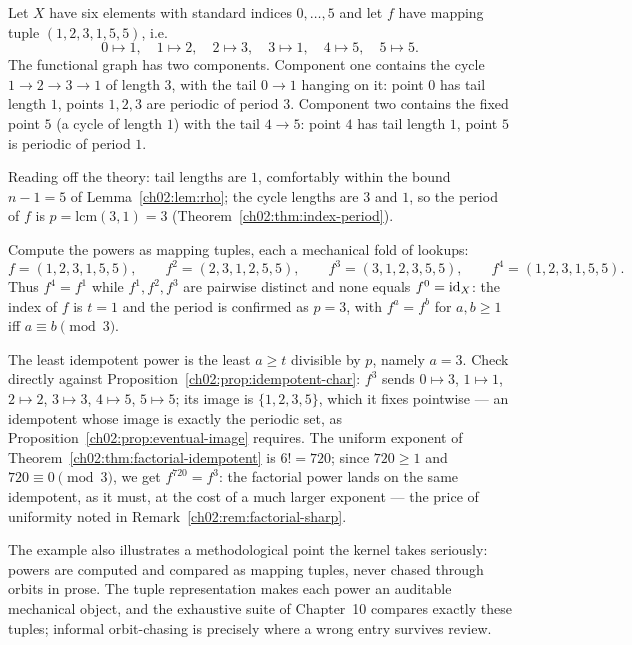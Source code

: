 \begin{example}\label{ch02:ex:funcgraph}
Let $X$ have six elements with standard indices $0, \dots, 5$ and let
$f$ have mapping tuple $(1, 2, 3, 1, 5, 5)$, i.e.
\[
0 \mapsto 1, \quad 1 \mapsto 2, \quad 2 \mapsto 3, \quad 3 \mapsto 1,
\quad 4 \mapsto 5, \quad 5 \mapsto 5.
\]
The functional graph has two components. Component one contains the
cycle $1 \to 2 \to 3 \to 1$ of length $3$, with the tail
$0 \to 1$ hanging on it: point $0$ has tail length $1$, points
$1, 2, 3$ are periodic of period $3$. Component two contains the fixed
point $5$ (a cycle of length $1$) with the tail $4 \to 5$: point $4$
has tail length $1$, point $5$ is periodic of period $1$.

Reading off the theory: tail lengths are $1$, comfortably within the
bound $n - 1 = 5$ of Lemma~\ref{ch02:lem:rho}; the cycle lengths are
$3$ and $1$, so the period of $f$ is $p = \mathrm{lcm}(3, 1) = 3$
(Theorem~\ref{ch02:thm:index-period}).

Compute the powers as mapping tuples, each a mechanical fold of
lookups:
\[
f = (1, 2, 3, 1, 5, 5), \qquad
f^{2} = (2, 3, 1, 2, 5, 5), \qquad
f^{3} = (3, 1, 2, 3, 5, 5), \qquad
f^{4} = (1, 2, 3, 1, 5, 5).
\]
Thus $f^{4} = f^{1}$ while $f^{1}, f^{2}, f^{3}$ are pairwise distinct
and none equals $f^{0} = \mathrm{id}_X$: the index of $f$ is $t = 1$ and the
period is confirmed as $p = 3$, with $f^{a} = f^{b}$ for
$a, b \geq 1$ iff $a \equiv b \pmod 3$.

The least idempotent power is the least $a \geq t$ divisible by $p$,
namely $a = 3$. Check directly against
Proposition~\ref{ch02:prop:idempotent-char}: $f^{3}$ sends
$0 \mapsto 3$, $1 \mapsto 1$, $2 \mapsto 2$, $3 \mapsto 3$,
$4 \mapsto 5$, $5 \mapsto 5$; its image is $\{1, 2, 3, 5\}$, which it
fixes pointwise --- an idempotent whose image is exactly the periodic
set, as Proposition~\ref{ch02:prop:eventual-image} requires. The
uniform exponent of Theorem~\ref{ch02:thm:factorial-idempotent} is
$6! = 720$; since $720 \geq 1$ and $720 \equiv 0 \pmod 3$, we get
$f^{720} = f^{3}$: the factorial power lands on the same idempotent, as
it must, at the cost of a much larger exponent --- the price of
uniformity noted in Remark~\ref{ch02:rem:factorial-sharp}.
\end{example}

The example also illustrates a methodological point the kernel takes
seriously: powers are computed and compared as mapping tuples, never
chased through orbits in prose. The tuple representation makes each
power an auditable mechanical object, and the exhaustive suite of
Chapter~10 compares exactly these tuples; informal orbit-chasing is
precisely where a wrong entry survives review.

